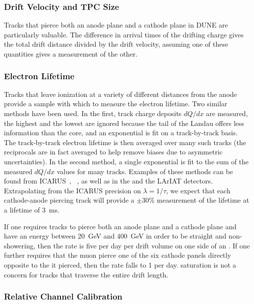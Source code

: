 \subsubsection{Drift Velocity and TPC Size}

Tracks that pierce both an anode plane and a cathode plane in DUNE are particularly valuable. %
The difference in arrival times of the drifting charge gives the total drift distance divided by the
drift velocity, assuming one of these quantities gives a measurement of the other.

\subsubsection{Electron Lifetime}

Tracks that leave ionization at a variety of different distances from the anode provide a sample
with which to measure the electron lifetime.  Two similar methods have been used.  In the
first, track charge deposits $dQ/dx$ are measured, the highest and the lowest are ignored because
the tail of the Landau offers less information than the core, and an exponential is fit on a 
track-by-track basis.  The track-by-track electron lifetime is then averaged over many such tracks
(the reciprocals are in fact averaged to help remove biases due to asymmetric uncertainties).  In
the second method, a single exponential is fit to the sum of the measured $dQ/dx$ values for many tracks.
Examples of these methods can be found from ICARUS~\cite{Antonello:2014eha}, 
~\cite{Meddage:2017lxo,MICROBOONE-NOTE-1026-PUB}, as well as in the  and
the LArIAT detectors.  Extrapolating from the ICARUS precision on $\lambda = 1/\tau$, we expect
that each cathode-anode piercing track will provide a $\pm 30$\% measurement of the lifetime
at a lifetime of \SI{3}{\milli\s}.

If one requires tracks to pierce both an anode plane and a cathode plane and have an energy between \SI{20}{\GeV}
and \SI{400}{\GeV} in order to be straight and non-showering, then the rate is five per day per drift volume
on one side of an .  If one further requires that the muon pierce one of the six cathode panels
directly opposite to the  it pierced, then the rate falls to \num{1} per day.   saturation is not
a concern for tracks that traverse the entire drift length.

\subsubsection{Relative Channel Calibration}

